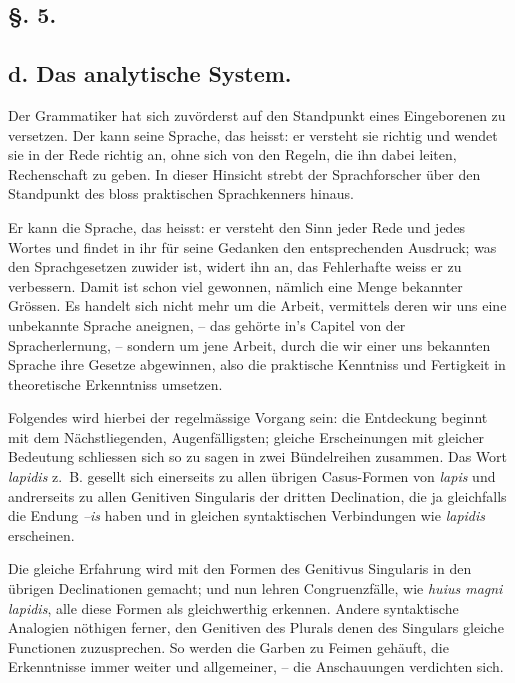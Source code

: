 \subsection*{§. 5.}\label{II.VI.5}
\subsection*{d. Das analytische System.}

\largerpage[1]Der Grammatiker hat sich zuvörderst auf den Standpunkt eines Eingeborenen zu versetzen. Der kann seine Sprache, das heisst: er versteht sie richtig und wendet sie in der Rede richtig an, ohne sich von den Regeln, die ihn dabei leiten, Rechenschaft zu geben. In dieser Hinsicht strebt der Sprachforscher über den Standpunkt des bloss praktischen Sprachkenners hinaus.

\label{sp.89}

Er kann die Sprache, das heisst: er versteht den Sinn jeder Rede und jedes Wortes und findet in ihr für seine Gedanken den entsprechenden Ausdruck; was den Sprachgesetzen zuwider ist, widert ihn an, das Fehlerhafte weiss er zu verbessern. Damit ist schon viel gewonnen, näm\label{fp.91}lich eine Menge bekannter Grössen. Es handelt sich nicht mehr um die Arbeit, vermittels deren wir uns eine unbekannte Sprache aneignen, – das gehörte in’s Capitel von der Spracherlernung, – sondern um jene Arbeit, durch die wir einer uns bekannten Sprache ihre Gesetze abgewinnen, also die praktische Kenntniss und Fertigkeit in theoretische Erkenntniss umsetzen.

Folgendes wird hierbei der regelmässige Vorgang sein: die Entdeckung beginnt mit dem Nächstliegenden, Augenfälligsten; gleiche Erscheinungen mit gleicher Bedeutung schliessen sich so zu sagen in zwei Bündelreihen zusammen. Das Wort \textit{lapidis} z.~B. gesellt sich einerseits zu allen übrigen Casus-Formen von \textit{lapis} und andrerseits zu allen Genitiven Singularis der dritten Declination, die ja gleichfalls die Endung \textit{–is} haben und in gleichen syntaktischen Verbindungen wie \textit{lapidis} erscheinen.

Die gleiche Erfahrung wird mit den Formen des Genitivus Singularis in den übrigen Declinationen gemacht; und nun lehren Congruenzfälle, wie \textit{huius magni lapidis}, alle diese Formen als gleichwerthig erkennen. Andere syntaktische Analogien nöthigen ferner, den Genitiven des Plurals denen des Singulars gleiche Functionen zuzusprechen. So werden die Garben zu Feimen gehäuft, die Erkenntnisse immer weiter und allgemeiner, – die Anschauungen verdichten sich.

